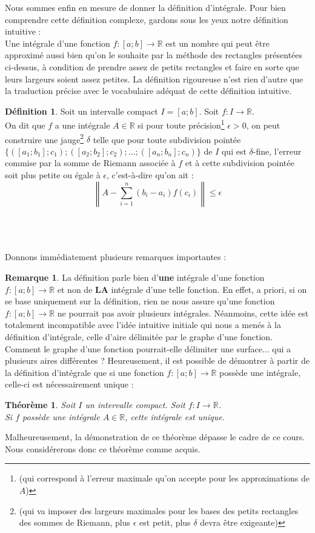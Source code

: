 \documentclass[a4paper,fontsize=13pt]{scrreprt}
\theoremstyle{plain}
\newtheorem{thé}[subsection]{Théorème}
\theoremstyle{definition}
\newtheorem{déf}[subsection]{Définition}
\newtheorem{rema}[subsection]{Remarque}
\newcommand{\rr}{\mathbb{R}}
\begin{document}
\newpage
Nous sommes enfin en mesure de donner la définition d'intégrale. Pour bien comprendre cette définition complexe, gardons sous les yeux notre définition intuitive : \\
\og Une intégrale d'une fonction $f : [a;b] \to \rr$ est un nombre qui peut être approximé aussi bien qu'on le souhaite par la méthode des rectangles présentées ci-dessus, à condition de prendre assez de petits rectangles et faire en sorte que leurs largeurs soient assez petites.  \fg{}
La définition rigoureuse n'est rien d'autre que la traduction précise avec le vocabulaire adéquat de cette définition intuitive.
\begin{déf}
Soit un intervalle compact $I = [a;b]$. Soit $f : I \to \rr$. \\
On dit que $f$ a une intégrale $A \in \rr$ si pour toute précision\footnote{(qui correspond à l'erreur maximale qu'on accepte pour les approximations de $A$)} $\epsilon > 0$, on peut construire une jauge\footnote{(qui va imposer des largeurs maximales pour les bases des petits rectangles des sommes de Riemann, plus $\epsilon$ est petit, plus $\delta$ devra être exigeante)} $\delta$ telle que pour toute subdivision pointée $\{([a_1;b_1];c_1);([a_2;b_2];c_2);...;([a_n;b_n];c_n)\}$ de $I$ qui est $\delta$-fine, l'erreur commise par la somme de Riemann associée à $f$ et à cette subdivision pointée soit plus petite ou égale à $\epsilon$, c'est-à-dire qu'on ait :
$$\left\|A - \sum\limits_{i=1}^{n} (b_i - a_i) f(c_i) \right\| \le \epsilon$$
\end{déf}
~\\~\\~\\
Donnons immédiatement plusieurs remarques importantes :
\begin{rema}
La définition parle bien d'\textbf{une} intégrale d'une fonction $f : [a;b] \to \rr$ et non de \textbf{LA} intégrale d'une telle fonction. En effet, a priori, si on se base uniquement sur la définition, rien ne nous assure qu'une fonction $f : [a;b] \to \rr$ ne pourrait pas avoir plusieurs intégrales. Néanmoins, cette idée est totalement incompatible avec l'idée intuitive initiale qui nous a menés à la définition d'intégrale, celle d'aire délimitée par le graphe d'une fonction. Comment le graphe d'une fonction pourrait-elle délimiter une surface... qui a plusieurs aires différentes ? Heureusement, il est possible de démontrer à partir de la définition d'intégrale que si une fonction $f : [a;b] \to \rr$ possède une intégrale, celle-ci est nécessairement unique :
\begin{thé}
Soit $I$ un intervalle compact. Soit $f : I \to \rr$. \\
Si $f$ possède une intégrale $A \in \rr$, cette intégrale est unique.
\end{thé}
Malheureusement, la démonstration de ce théorème dépasse le cadre de ce cours. Nous considérerons donc ce théorème comme acquis.
\end{rema}
\end{document}
